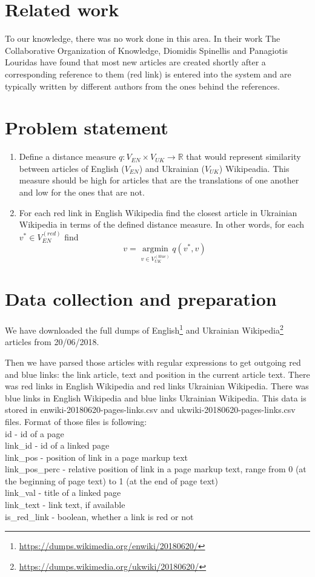 \documentclass[11pt,a4paper]{article}
\begin{document}
\section{Related work}

To our knowledge, there was no work done in this area. In their work The Collaborative Organization of Knowledge, Diomidis Spinellis and Panagiotis Louridas\cite{spinellis} have found that most new articles are created shortly after a corresponding reference to them (red link) is entered into the system and are typically written by different authors from the ones behind the references.

\section{Problem statement}

\begin{enumerate}
	\item Define a distance measure $q: V_{EN} \times V_{UK} \to \mathbb{R}$ that would represent similarity between articles of English ($V_{EN}$) and Ukrainian ($V_{UK}$) Wikipeadia. This measure should be high for articles that are the translations of one another and low for the ones that are not.
	\item For each red link in English Wikipedia find the closest article in Ukrainian Wikipedia in terms of the defined distance measure. In other words, for each $v^{*} \in V_{EN}^{(red)}$ find
	\[ v = \operatorname*{argmin}_{v \in V_{UK}^{(blue)}} q(v^{*}, v) \]
\end{enumerate}

\section{Data collection and preparation}

We have downloaded the full dumps of English\footnote{\url{https://dumps.wikimedia.org/enwiki/20180620/}} and Ukrainian Wikipedia\footnote{\url{https://dumps.wikimedia.org/ukwiki/20180620/}} articles from 20/06/2018. 

Then we have parsed those articles with regular expressions to get outgoing red and blue links: the link article, text and position in the current article text. There was red links in English Wikipedia and red links Ukrainian Wikipedia. There was blue links in English Wikipedia and blue links Ukrainian Wikipedia. This data is stored in enwiki-20180620-pages-links.csv and ukwiki-20180620-pages-links.csv files. Format of those files is following:\\
id - id of a page\\
link\_id - id of a linked page\\
link\_pos - position of link in a page markup text\\  
link\_pos\_perc - relative position of link in a page markup text, range from 0 (at the beginning of page text) to 1 (at the end of page text)\\  
link\_val - title of a linked page\\  
link\_text - link text, if available\\  
is\_red\_link - boolean, whether a link is red or not\\  
\end{document}
